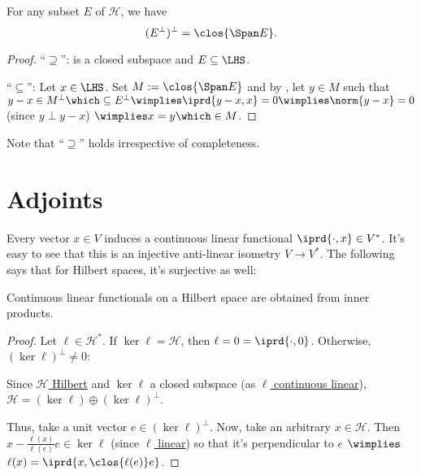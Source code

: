 	
	
	\begin{cor}
		For any subset $E$ of $\mathscr H$, we have
		\[
		(E^\perp)^\perp = \clos{\Span E}\text.
		\]
	\end{cor}
	
	\begin{proof}
		``$\supseteq$'': \LHS is a closed subspace and $E\subseteq \LHS$.
		
		``$\subseteq$'': Let $x\in\LHS$. Set $M := \clos{\Span E}$ and by , let $y\in M$ such that $y - x\in M^\perp\which\subseteq E^\perp \wimplies \iprd{y - x, x} = 0\wimplies \norm{y - x} = 0$ (since $y\perp y - x$) $\wimplies x = y\which\in M$.
	\end{proof}
	
	\begin{rmk}
		Note that ``$\supseteq$'' holds irrespective of completeness.
	\end{rmk}
	


\section{Adjoints}

	Every vector $x\in V$ induces a continuous linear functional $\iprd{\cdot, x}\in V^*$. It's easy to see that this is an injective anti-linear isometry $V\to V^*$. The following says that for Hilbert spaces, it's surjective as well:
	
	\begin{thm}
		Continuous linear functionals on a Hilbert space
		are obtained from inner products.
	\end{thm}
	
	\begin{proof}
		Let $\ell\in \mathscr H^*$. If $\ker\ell = \mathscr H$, then $\ell = 0 = \iprd{\cdot, 0}$. Otherwise, $(\ker\ell)^\perp\ne 0$:
		\begin{subproof}
			Since \uline{$\mathscr H$ Hilbert} and $\ker\ell$ a closed subspace (as \uline{$\ell$ continuous linear}), $\mathscr H = (\ker\ell)\oplus(\ker\ell)^\perp$.
		\end{subproof}
		Thus, take a unit vector $e\in(\ker\ell)^\perp$. Now, take an arbitrary $x\in \mathscr H$. Then $x - \frac{\ell(x)}{\ell(e)} e\in\ker\ell$ (since \uline{$\ell$ linear}) so that it's perpendicular to $e$ $\wimplies$ $\ell(x) = \iprd{x, \clos{\ell(e)} e}$.
	\end{proof}
	
